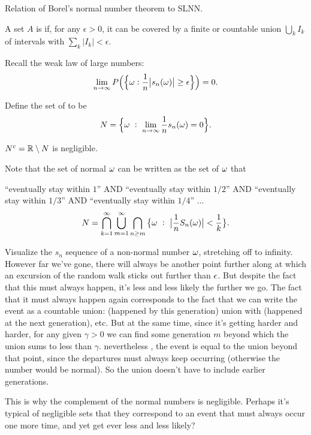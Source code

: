  Relation of Borel's normal number theorem to SLNN.

\begin{definition}
  A set $A$ is  if, for any $\epsilon > 0$, it can be covered by a finite or countable
  union $\bigcup_k I_k$ of intervals with $\sum_k |I_k| < \epsilon$.
\end{definition}

Recall the weak law of large numbers:
  \begin{align*}
    \lim_{n \to \infty}P\Big(\Big\{\om: \frac{1}{n}\big|s_n(\om)\big| \geq \epsilon\Big\}\Big) = 0.
  \end{align*}

\begin{definition}
  Define the set of  to be
  \begin{align*}
    N = \Big\{\om ~:~ \lim_{n\to\infty} \frac{1}{n}s_n(\om) = 0 \Big\}.
  \end{align*}
\end{definition}

\begin{theorem*}
  $N^c = \mathbb{R} \setminus N$ is negligible.
\end{theorem*}

\begin{intuition}
  Note that the set of normal $\omega$ can be written as the set of $\omega$ that

  ``eventually stay within $1$​'' AND
  ``eventually stay within $1/2$'' AND
  ``eventually stay within $1/3$'' AND
  ``eventually stay within $1/4$'' ...
  \begin{align*}
    N = \bigcap_{k=1}^\infty \bigcup_{m=1}^\infty\bigcap_{n \geq m} \big\{ \omega ~:~ \big|\frac{1}{n}S_n(\omega)\big| < \frac{1}{k} \big\}.
  \end{align*}

  Visualize the $s_n$ sequence of a non-normal number $\omega$, stretching off to infinity. However far we’ve
  gone, there will always be another point further along at which an excursion of the random walk sticks out
  further than $\epsilon$. But despite the fact that this must always happen, it’s less and less likely the further
  we go. The fact that it must always happen again corresponds to the fact that we can write the event as a
  countable union: (happened by this generation) union with (happened at the next generation), etc. But at the
  same time, since it’s getting harder and harder, for any given $\gamma >0$ we can find some generation $m$
  beyond which the union sums to less than $\gamma$. nevertheless , the event is equal to the union beyond that
  point, since the departures must always keep occurring (otherwise the number would be normal). So the union
  doesn’t have to include earlier generations.

  This is why the complement of the normal numbers is negligible. Perhaps it’s typical of negligible sets that
  they correspond to an event that must always occur one more time, and yet get ever less and less likely?
\end{intuition}

